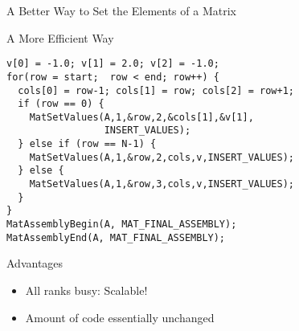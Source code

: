 \begin{frame}[fragile]{A Better Way to Set the Elements of a Matrix}

\begin{block}{A More Efficient Way}
\small
\begin{lstlisting}
v[0] = -1.0; v[1] = 2.0; v[2] = -1.0;
for(row = start;  row < end; row++) {
  cols[0] = row-1; cols[1] = row; cols[2] = row+1;
  if (row == 0) {
    MatSetValues(A,1,&row,2,&cols[1],&v[1],
                 INSERT_VALUES);
  } else if (row == N-1) {
    MatSetValues(A,1,&row,2,cols,v,INSERT_VALUES);
  } else {
    MatSetValues(A,1,&row,3,cols,v,INSERT_VALUES);
  }
}
MatAssemblyBegin(A, MAT_FINAL_ASSEMBLY);
MatAssemblyEnd(A, MAT_FINAL_ASSEMBLY);
\end{lstlisting}
\end{block}

\begin{block}{Advantages}
 \begin{itemize}
  \item All ranks busy: Scalable!
  \item Amount of code essentially unchanged
 \end{itemize}

\end{block}


\end{frame}

